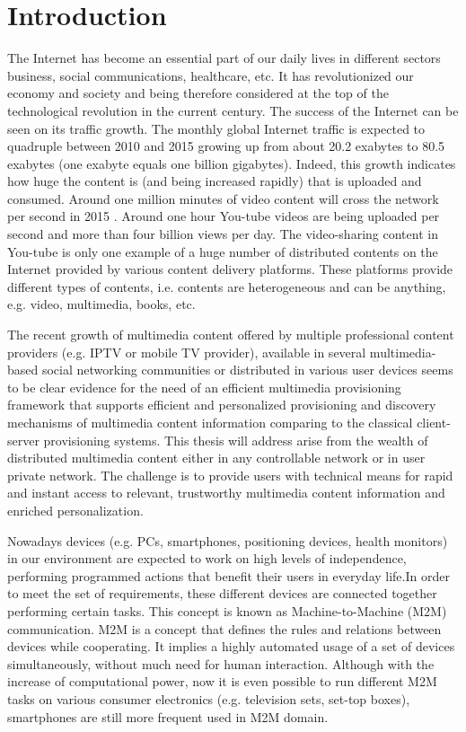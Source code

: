 \chapter{Introduction\label{cha:chapter1}}

The Internet has become an essential part of our daily lives in different sectors business, social communications, healthcare, etc. It has revolutionized our economy and society and being therefore considered at the top of the technological revolution in the current century. The success of the Internet can be seen on its traffic growth. The monthly global Internet traffic is expected to quadruple between 2010 and 2015 growing up from about 20.2 exabytes to 80.5 exabytes (one exabyte equals one billion gigabytes)\cite{cisco1}. Indeed, this growth indicates how huge the content is (and being increased rapidly) that is uploaded and consumed. Around one million minutes of video content will cross the network per second in 2015 \cite{cisco1}. Around one hour You-tube videos are being uploaded per second and more than four billion views per day\cite{youtube1}. The video-sharing content in You-tube is only one example of a huge number of distributed contents on the Internet provided by various content delivery platforms. These platforms provide different types of contents, i.e. contents are heterogeneous and can be anything, e.g. video, multimedia, books, etc. 

The recent growth of multimedia content offered by multiple professional content providers (e.g. IPTV or mobile TV provider), available in several multimedia-based social networking communities or distributed in various user devices seems to be clear evidence for the need of an efficient multimedia provisioning framework that supports efficient and personalized provisioning and discovery mechanisms of multimedia content information comparing to the classical client-server provisioning systems. This thesis will address arise from the wealth of distributed multimedia content either in any controllable network or in user private network. The challenge is to provide users with technical means for rapid and instant access to relevant, trustworthy multimedia content information and enriched personalization.

Nowadays devices (e.g. PCs, smartphones, positioning devices, health monitors) in our environment are expected to work on high levels of independence, performing programmed actions that benefit their users in everyday life.In order to meet the set of requirements, these different
devices are connected together performing certain tasks. This concept is known as Machine-to-Machine (M2M) communication. M2M is a concept that defines the rules and relations between devices while cooperating. It implies a highly automated usage of a set of devices simultaneously, without much need for human interaction. Although with the increase of computational power, now it is even possible to run different M2M tasks on various consumer electronics (e.g. television sets, set-top boxes), smartphones are still more frequent used in M2M domain.

